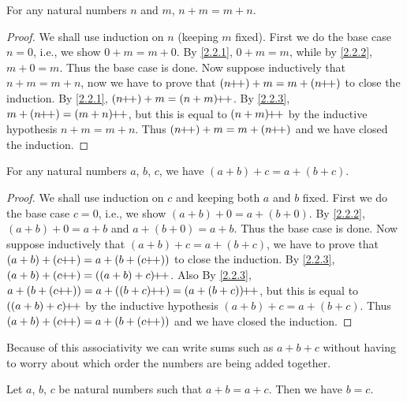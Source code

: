 \begin{prop}\label{2.2.4}
  For any natural numbers \(n\) and \(m\), \(n + m = m + n\).
\end{prop}

\begin{proof}
  We shall use induction on \(n\) (keeping \(m\) fixed).
  First we do the base case \(n = 0\), i.e., we show \(0 + m = m + 0\).
  By \cref{2.2.1}, \(0 + m = m\), while by \cref{2.2.2}, \(m + 0 = m\).
  Thus the base case is done.
  Now suppose inductively that \(n + m = m + n\), now we have to prove that \((n\pp) + m = m + (n\pp)\) to close the induction.
  By \cref{2.2.1}, \((n\pp) + m = (n + m)\pp\).
  By \cref{2.2.3}, \(m + (n\pp) = (m + n)\pp\), but this is equal to \((n + m)\!\!+\!\!+\) by the inductive hypothesis \(n+m=m+n\).
  Thus \((n\pp) + m = m + (n\pp)\) and we have closed the induction.
\end{proof}

\begin{prop}\label{2.2.5}
  For any natural numbers \(a\), \(b\), \(c\), we have \((a + b) + c = a + (b + c)\).
\end{prop}

\begin{proof}
  We shall use induction on \(c\) and keeping both \(a\) and \(b\) fixed.
  First we do the base case \(c = 0\), i.e., we show \((a + b) + 0 = a + (b + 0)\).
  By \cref{2.2.2}, \((a + b) + 0 = a + b\) and \(a + (b + 0) = a + b\).
  Thus the base case is done.
  Now suppose inductively that \((a + b) + c = a + (b + c)\), we have to prove that \((a + b) + (c\pp) = a + (b + (c\pp))\) to close the induction.
  By \cref{2.2.3}, \((a + b) + (c\pp) = ((a + b) + c)\pp\).
  Also By \cref{2.2.3}, \(a + (b + (c\pp)) = a + ((b + c)\pp) = (a + (b + c))\pp\), but this is equal to \(((a + b) + c)\!\!+\!\!+\) by the inductive hypothesis \((a + b) + c = a + (b + c)\).
  Thus \((a + b) + (c\pp) = a + (b + (c\pp))\) and we have closed the induction.
\end{proof}

\begin{note}
  Because of this associativity we can write sums such as \(a + b + c\) without having to worry about which order the numbers are being added together.
\end{note}

\begin{prop}\label{2.2.6}
  Let \(a\), \(b\), \(c\) be natural numbers such that \(a + b = a + c\).
  Then we have \(b = c\).
\end{prop}

